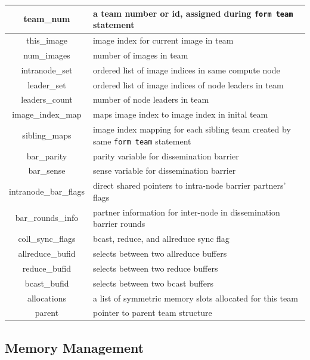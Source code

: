 \begin{table}[!h]
\begin{tabular}{|c|L{4.2in}|}
 team\_num          & a team number or id, assigned during \texttt{form team} statement\\ \hline
 this\_image        & image index for current image in team \\ \hline
 num\_images        & number of images in team \\ \hline
intranode\_set      & ordered list of image indices in same compute node\\\hline
leader\_set         & ordered list of image indices of node leaders in team\\\hline
 leaders\_count     & number of node leaders in team\\\hline
 image\_index\_map  & maps image index to image index in inital team\\ \hline 
 sibling\_maps      & image index mapping for each sibling team created by same \texttt{form team} statement \\\hline
 bar\_parity                  & parity variable for dissemination barrier\\\hline 
bar\_sense                   & sense variable for dissemination barrier\\\hline
intranode\_bar\_flags        & direct shared pointers to intra-node barrier partners' flags\\\hline
bar\_rounds\_info            & partner information for inter-node in dissemination barrier rounds \\\hline
coll\_sync\_flags            & bcast, reduce, and allreduce sync flag\\     \hline
allreduce\_bufid             & selects between two allreduce buffers\\\hline
 reduce\_bufid                & selects between two reduce buffers\\\hline
 bcast\_bufid                 & selects between two bcast buffers \\\hline
 allocations     & a list of symmetric memory slots allocated for this team\\\hline 
 parent  		 & pointer to parent team structure\\\hline
\end{tabular}


\end{table}

\subsection{Memory Management}\label{sec:mm}


